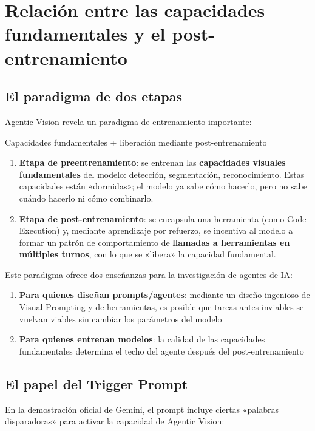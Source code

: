 \section{Relación entre las capacidades fundamentales y el post-entrenamiento}

\subsection{El paradigma de dos etapas}

Agentic Vision revela un paradigma de entrenamiento importante:

\begin{importantbox}{Capacidades fundamentales + liberación mediante post-entrenamiento}
\begin{enumerate}
    \item \textbf{Etapa de preentrenamiento}: se entrenan las \textbf{capacidades visuales fundamentales} del modelo: detección, segmentación, reconocimiento. Estas capacidades están «dormidas»; el modelo ya sabe cómo hacerlo, pero no sabe cuándo hacerlo ni cómo combinarlo.
    \item \textbf{Etapa de post-entrenamiento}: se encapsula una herramienta (como Code Execution) y, mediante aprendizaje por refuerzo, se incentiva al modelo a formar un patrón de comportamiento de \textbf{llamadas a herramientas en múltiples turnos}, con lo que se «libera» la capacidad fundamental.
\end{enumerate}
\end{importantbox}

Este paradigma ofrece dos enseñanzas para la investigación de agentes de IA:

\begin{enumerate}
    \item \textbf{Para quienes diseñan prompts/agentes}: mediante un diseño ingenioso de Visual Prompting y de herramientas, es posible que tareas antes inviables se vuelvan viables sin cambiar los parámetros del modelo
    \item \textbf{Para quienes entrenan modelos}: la calidad de las capacidades fundamentales determina el techo del agente después del post-entrenamiento
\end{enumerate}

\subsection{El papel del Trigger Prompt}

En la demostración oficial de Gemini, el prompt incluye ciertas «palabras disparadoras» para activar la capacidad de Agentic Vision:

